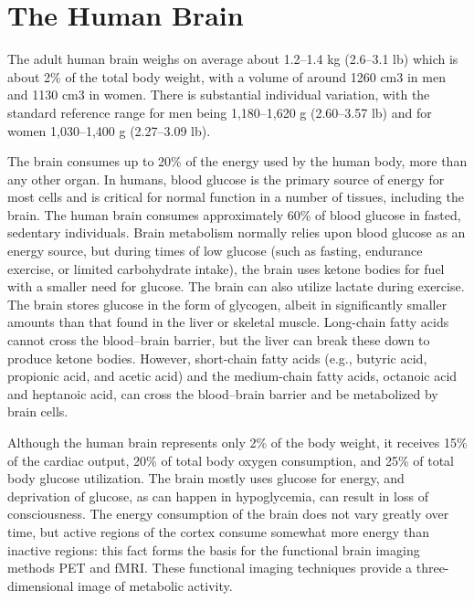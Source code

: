 \documentclass[]{book}
\begin{document}
\hypertarget{the-human-brain}{%
\section{The Human Brain}\label{the-human-brain}}

The adult human brain weighs on average about 1.2--1.4 kg (2.6--3.1 lb) which is about 2\% of the total body weight, with a volume of around 1260 cm3 in men and 1130 cm3 in women. There is substantial individual variation, with the standard reference range for men being 1,180--1,620 g (2.60--3.57 lb) and for women 1,030--1,400 g (2.27--3.09 lb).

The brain consumes up to 20\% of the energy used by the human body, more than any other organ. In humans, blood glucose is the primary source of energy for most cells and is critical for normal function in a number of tissues, including the brain. The human brain consumes approximately 60\% of blood glucose in fasted, sedentary individuals. Brain metabolism normally relies upon blood glucose as an energy source, but during times of low glucose (such as fasting, endurance exercise, or limited carbohydrate intake), the brain uses ketone bodies for fuel with a smaller need for glucose. The brain can also utilize lactate during exercise. The brain stores glucose in the form of glycogen, albeit in significantly smaller amounts than that found in the liver or skeletal muscle. Long-chain fatty acids cannot cross the blood--brain barrier, but the liver can break these down to produce ketone bodies. However, short-chain fatty acids (e.g., butyric acid, propionic acid, and acetic acid) and the medium-chain fatty acids, octanoic acid and heptanoic acid, can cross the blood--brain barrier and be metabolized by brain cells.

Although the human brain represents only 2\% of the body weight, it receives 15\% of the cardiac output, 20\% of total body oxygen consumption, and 25\% of total body glucose utilization. The brain mostly uses glucose for energy, and deprivation of glucose, as can happen in hypoglycemia, can result in loss of consciousness. The energy consumption of the brain does not vary greatly over time, but active regions of the cortex consume somewhat more energy than inactive regions: this fact forms the basis for the functional brain imaging methods PET and fMRI. These functional imaging techniques provide a three-dimensional image of metabolic activity.
\end{document}
